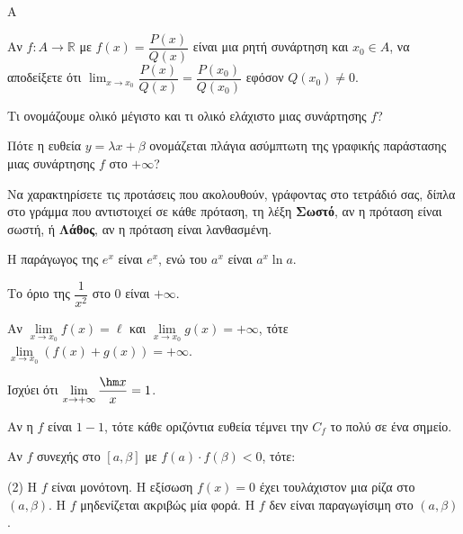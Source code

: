 \begin{thema}{A}
\begin{erwthma}
    \item Αν $ f:A\to\mathbb{R} $ με $ f(x)=\dfrac{P(x)}{Q(x)} $ είναι μια ρητή συνάρτηση και $ x_0\in A $, να αποδείξετε ότι $ {\displaystyle{\lim_{x\to x_0}{\dfrac{P(x)}{Q(x)}}=\dfrac{P(x_0)}{Q(x_0)}}} $ εφόσον $ Q(x_0)\neq0 $.
    \item Τι ονομάζουμε ολικό μέγιστο και τι ολικό ελάχιστο μιας συνάρτησης $f$?
    \item Πότε η ευθεία $y=\lambda x+\beta$ ονομάζεται πλάγια ασύμπτωτη της γραφικής παράστασης μιας συνάρτησης $f$ στο $+\infty$?
    \item Να χαρακτηρίσετε τις προτάσεις που ακολουθούν, γράφοντας στο τετράδιό σας, δίπλα στο γράμμα που αντιστοιχεί σε κάθε πρόταση, τη λέξη \textbf{Σωστό}, αν η πρόταση είναι σωστή, ή \textbf{Λάθος}, αν η πρόταση είναι λανθασμένη.
    \begin{alist}
        \item Η παράγωγος της $e^x$ είναι $e^x$, ενώ του $a^x$ είναι $a^x \ln a$.
        \item Το όριο της $\dfrac{1}{x^2}$ στο 0 είναι $+\infty$.
        \item Αν $\lim\limits_{x\to x_0} f(x) = \ell$ και $\lim\limits_{x\to x_0} g(x) = +\infty$, τότε $\lim\limits_{x\to x_0} (f(x)+g(x)) = +\infty$.
        \item Ισχύει ότι $\lim\limits_{x \to +\infty} \dfrac{\hm x}{x} = 1$.
        \item Αν η $f$ είναι $1-1$, τότε κάθε οριζόντια ευθεία τέμνει την $C_f$ το πολύ σε ένα σημείο.
    \end{alist}
    \item Αν $f$ συνεχής στο $[a,\beta]$ με $f(a) \cdot f(\beta) < 0$, τότε:
    \begin{tasks}[label=\let\textdexiakeraia\relax\alph*.](2)
        \task Η $f$ είναι μονότονη.
        \task Η εξίσωση $f(x) = 0$ έχει τουλάχιστον μια ρίζα στο $(a,\beta)$.
        \task Η $f$ μηδενίζεται ακριβώς μία φορά.
        \task Η $f$ δεν είναι παραγωγίσιμη στο $(a,\beta)$.
    \end{tasks}
\end{erwthma}
\end{thema}
